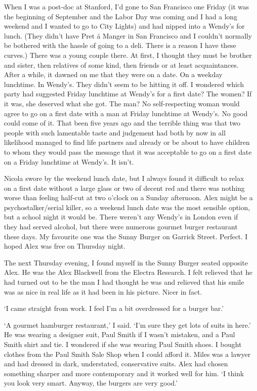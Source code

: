When I was a post-doc at Stanford, I'd gone to San Francisco one
Friday (it was the beginning of September and the Labor Day was coming and I had a long weekend and I wanted to go to City Lights) and had nipped into a Wendy's for lunch. (They didn't have
Pret á Manger in San Francisco and I couldn't normally be
bothered with the hassle of going to a deli. There is a reason I
have these curves.) There was a young couple there. At first, I
thought they must be brother and sister, then relatives of some
kind, then friends or at least acquaintances. After a while, it
dawned on me that they were on a {\twelveit date\/}. On a weekday
lunchtime. In Wendy's. They didn't seem to be hitting it off. I
wondered which party had suggested Friday lunchtime at Wendy's for a
first date? The women? If it was, she deserved what she got. The
man? No self-respecting woman would agree to go on a first date with
a man at Friday lunchtime at Wendy's. No good could come of it. That
been five years ago and the terrible thing was that two people with
such lamentable taste and judgement had both by now in all
likelihood managed to find life partners and already or be about to have children to whom
they would pass the message that it was acceptable to go on a first
date on a Friday lunchtime at Wendy's. It isn't.

Nicola swore by the weekend lunch date, but I always found it difficult
to relax on a first date without a large glass or two of decent red
and there was nothing worse than feeling half-cut at two o'clock on
a Sunday afternoon. Alex might be a psychostalker/serial killer, so
a weekend lunch date was the most sensible option, but a school
night it would be. There weren't any Wendy's in London even if they
had served alcohol, but there were numerous gourmet burger
restaurant these days. My favourite one was the Sunny Burger on
Garrick Street. Perfect. I hoped Alex was free on Thursday night.

\vskip 1cm The next Thursday evening, I found myself in the Sunny
Burger seated opposite Alex. He was the Alex Blackwell from the
Electra Research. I felt relieved that he had turned out to be the
man I had thought he was and relieved that his smile was as nice in
real life as it had been in his picture. Nicer in fact.

`I came straight from work. I feel I'm a bit overdressed for a
burger bar.'

`A gourmet hamburger restaurant,' I said. `I'm sure they get lots of
suits in here.' He was wearing a designer suit, Paul Smith if I
wasn't mistaken, and a Paul Smith shirt and tie. I wondered if she
was wearing Paul Smith shoes. I bought clothes from the Paul Smith
Sale Shop when I could afford it. Miles was a lawyer and had dressed
in dark, understated, conservative suits. Alex had chosen something
sharper and more contemporary and it worked well for him. `I think
you look very smart. Anyway, the burgers are very good.'

